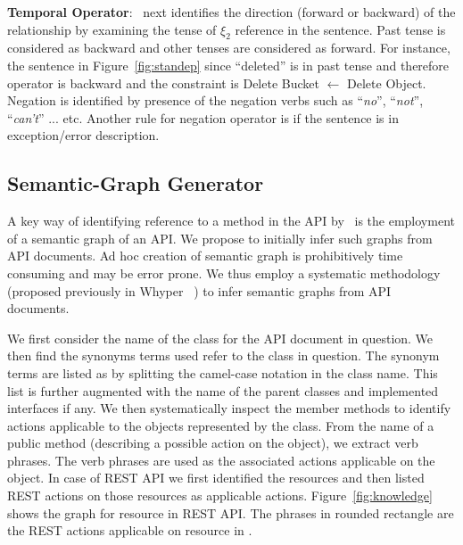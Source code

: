 \textbf{Temporal Operator}:
\tool\ next identifies the direction (forward or backward) of the relationship by examining the tense of $\xi_2$ reference in the sentence.
Past tense is considered as backward and other tenses are considered as forward.
For instance, the sentence in Figure~\ref{fig:standep} since ``deleted'' is in past tense and therefore operator is backward and the constraint is 
Delete Bucket $\leftarrow$ Delete Object.
Negation is identified by presence of the negation verbs such as ``\textit{no}'', ``\textit{not}'', ``\textit{can't}'' ... etc.
Another rule for negation operator is if the sentence is in exception/error description. 



\subsection{Semantic-Graph Generator}
\label{sub:ACA}

A key way of identifying reference to a method in the API by \tool\ is the employment of a semantic graph of an API.
We propose to initially infer such graphs from API documents.
Ad hoc creation of semantic graph is prohibitively time consuming and may be error prone.
We thus employ a systematic methodology (proposed previously in Whyper ~\cite{pandita13:WHYPER}) to infer semantic graphs from API documents.

We first consider the name of the class for the API document in question.
We then find the synonyms terms used refer to the class in question.
The synonym terms are listed as by splitting the camel-case notation in the class name.
This list is further augmented with the name of the parent classes and implemented interfaces if any. We then systematically inspect the member methods to identify actions applicable to the objects represented by the class. From the name of a public method (describing a possible action on the object), we extract verb phrases. The verb phrases are used as the associated actions applicable on the object. In case of REST API we first identified the resources and then listed REST actions on those resources as applicable actions. Figure~\ref{fig:knowledge} shows the graph for  resource in REST API. The phrases in rounded rectangle are the REST actions applicable on  resource in \amazonAPI.

